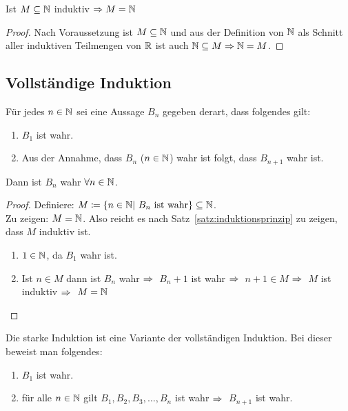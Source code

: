 \begin{satz}[Induktionsprinzip]
    \label{satz:induktionsprinzip}
    Ist $M\subseteq \mathbb{N}$ induktiv $\Rightarrow{} M = \mathbb{N}$
    \begin{proof}
        Nach Voraussetzung ist $M\subseteq \mathbb{N}$ und aus der Definition von $\mathbb{N}$ als Schnitt aller induktiven Teilmengen von $\mathbb{R}$ ist auch $\mathbb{N}\subseteq M \Rightarrow{} \mathbb{N} = M$.
    \end{proof}
\end{satz}

\newpage


\subsection{Vollständige Induktion}

\begin{satz}[Induktionsbeweis]
    Für jedes $n\in\mathbb{N}$ sei eine Aussage $B_n$ gegeben derart, dass folgendes gilt:
    \begin{enumerate}
        \item $B_1$ ist wahr.
        \item Aus der Annahme, dass $B_n$ ($n\in\mathbb{N}$) wahr ist folgt, dass $B_{n+1}$ wahr ist.
    \end{enumerate}
    Dann ist $B_n$ wahr $\forall n\in\mathbb{N}$.
    \begin{proof}
        Definiere: $M\coloneqq\left\{n\in\mathbb{N}|~B_n\text{ ist wahr}\right\} \subseteq \mathbb{N}$.\\
        Zu zeigen: $M=\mathbb{N}$. Also reicht es nach Satz~\ref{satz:induktionsprinzip} zu zeigen, dass $M$ induktiv ist.
        \begin{enumerate}
            \item $1\in\mathbb{N}$, da $B_1$ wahr ist.
            \item Ist $n\in M$ dann ist $B_n$ wahr $\Rightarrow{}$ $B_n+1$ ist wahr $\Rightarrow{}$ $n+1\in M$ $\Rightarrow{}$ $M$ ist induktiv $\Rightarrow{}$ $M=\mathbb{N}$ \qedhere
        \end{enumerate}
    \end{proof}
\end{satz}

\begin{bemerkung}
    Die starke Induktion ist eine Variante der vollständigen Induktion. Bei dieser beweist man folgendes:
    \begin{enumerate}
        \item $B_1$ ist wahr.
        \item für alle $n\in\mathbb{N}$ gilt $B_1, B_2, B_3, \dots, B_n$ ist wahr $\Rightarrow{}$ $B_{n+1}$ ist wahr.
    \end{enumerate}
\end{bemerkung}

